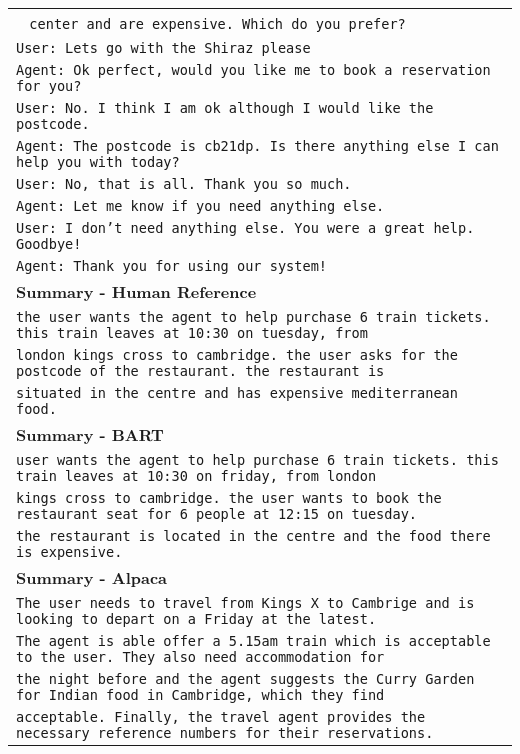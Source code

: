 \documentclass[11pt]{article}
\begin{document}
\begin{table*}[t]
\begin{adjustbox}{width=1.00\textwidth,center}
\begin{tabular}{ | l | }
        \quad\quad\quad~ \texttt{center and are expensive. Which do you prefer? } \\
        \texttt{User: Lets go with the Shiraz please} \\
        \texttt{Agent: Ok perfect, would you like me to book a reservation for you?} \\
        \texttt{User: No. I think I am ok although I would like the postcode.} \\
        \texttt{Agent: The postcode is cb21dp. Is there anything else I can help you with today?} \\
        \texttt{User: No, that is all. Thank you so much.} \\
        \texttt{Agent: Let me know if you need anything else.} \\
        \texttt{User: I don't need anything else. You were a great help. Goodbye!} \\
        \texttt{Agent: Thank you for using our system!} \\


        \hline \hline
        
        \textbf{Summary - Human Reference} \\ \hline
        \texttt{the user wants the agent to help purchase 6 train tickets. this train leaves at 10:30 on tuesday, from } \\
        \texttt{london kings cross to cambridge. the user asks for the postcode of the restaurant. the restaurant is } \\
        \texttt{situated in the centre and has expensive mediterranean food.} \\ \hline
        
        \textbf{Summary - BART} \\ \hline 
        \texttt{user wants the agent to help purchase 6 train tickets. this train leaves at 10:30 on friday, from london} \\
        \texttt{kings cross to cambridge. the user wants to book the restaurant seat for 6 people at 12:15 on tuesday. } \\
        \texttt{the restaurant is located in the centre and the food there is expensive.}  \\ \hline \hline
        
        \textbf{Summary - Alpaca} \\ \hline
        \texttt{The user needs to travel from Kings X to Cambrige and is looking to depart on a Friday at the latest. } \\
        \texttt{The agent is able offer a 5.15am train which is acceptable to the user. They also need accommodation for } \\
        \texttt{the night before and the agent suggests the Curry Garden for Indian food in Cambridge, which they find } \\
        \texttt{acceptable. Finally, the travel agent provides the necessary reference numbers for their reservations.}\\ \hline \hline
        

\end{tabular}
\end{adjustbox}
\end{table*}
\end{document}
